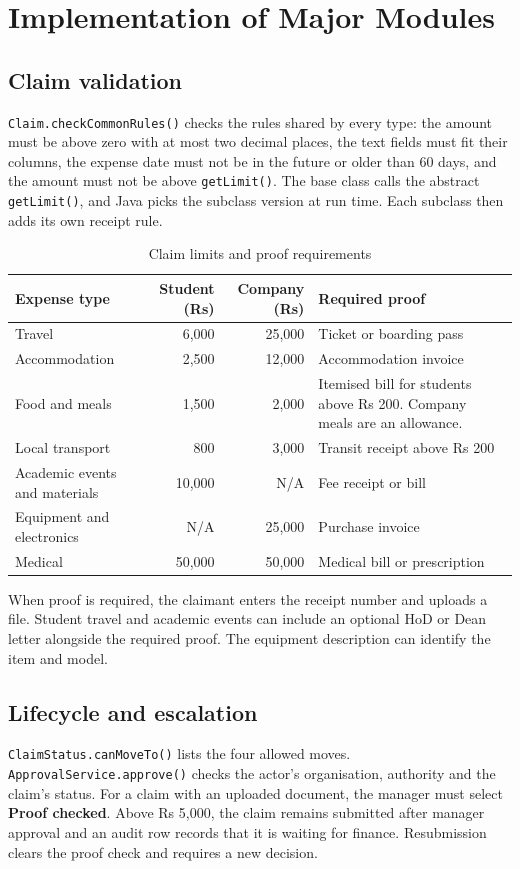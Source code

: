 \documentclass[12pt,a4paper]{report}
\begin{document}
\section{Implementation of Major Modules}

\subsection*{Claim validation}
\texttt{Claim.checkCommonRules()} checks the rules shared by every type: the amount must be above zero with at most two decimal places, the text fields must fit their columns, the expense date must not be in the future or older than 60 days, and the amount must not be above \texttt{getLimit()}. The base class calls the abstract \texttt{getLimit()}, and Java picks the subclass version at run time. Each subclass then adds its own receipt rule.

\begin{table}[H]
\centering
\small
\begin{tabularx}{\linewidth}{>{\raggedright\arraybackslash}p{3.5cm} r r Y}
\toprule
Expense type & Student (Rs) & Company (Rs) & Required proof\\
\midrule
Travel & 6,000 & 25,000 & Ticket or boarding pass\\
Accommodation & 2,500 & 12,000 & Accommodation invoice\\
Food and meals & 1,500 & 2,000 & Itemised bill for students above Rs 200. Company meals are an allowance.\\
Local transport & 800 & 3,000 & Transit receipt above Rs 200\\
Academic events and materials & 10,000 & N/A & Fee receipt or bill\\
Equipment and electronics & N/A & 25,000 & Purchase invoice\\
Medical & 50,000 & 50,000 & Medical bill or prescription\\
\bottomrule
\end{tabularx}
\caption{Claim limits and proof requirements}
\end{table}

When proof is required, the claimant enters the receipt number and uploads a file. Student travel and academic events can include an optional HoD or Dean letter alongside the required proof. The equipment description can identify the item and model.

\subsection*{Lifecycle and escalation}
\texttt{ClaimStatus.canMoveTo()} lists the four allowed moves. \texttt{ApprovalService.approve()} checks the actor's organisation, authority and the claim's status. For a claim with an uploaded document, the manager must select \textbf{Proof checked}. Above Rs 5,000, the claim remains submitted after manager approval and an audit row records that it is waiting for finance. Resubmission clears the proof check and requires a new decision.
\end{document}
